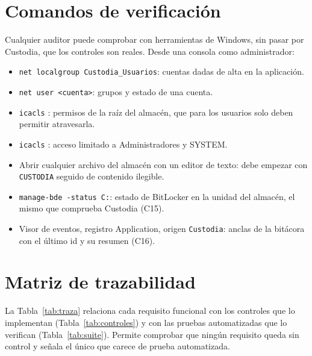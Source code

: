 \documentclass[conference]{IEEEtran}
\begin{document}
\section{Comandos de verificación}
\label{anx:comandos}
Cualquier auditor puede comprobar con herramientas de Windows, sin pasar por Custodia, que los controles son reales. Desde una consola como administrador:
\begin{itemize}
    \item \texttt{net localgroup Custodia\_Usuarios}: cuentas dadas de alta en la aplicación.
    \item \texttt{net user <cuenta>}: grupos y estado de una cuenta.
    \item \texttt{icacls} : permisos de la raíz del almacén, que para los usuarios solo deben permitir atravesarla.
    \item \texttt{icacls} : acceso limitado a Administradores y SYSTEM.
    \item Abrir cualquier archivo del almacén con un editor de texto: debe empezar con \texttt{CUSTODIA} seguido de contenido ilegible.
    \item \texttt{manage-bde -status C:}: estado de BitLocker en la unidad del almacén, el mismo que comprueba Custodia (C15).
    \item Visor de eventos, registro Application, origen \texttt{Custodia}: anclas de la bitácora con el último id y su resumen (C16).
\end{itemize}

\section{Matriz de trazabilidad}
\label{anx:trazabilidad}
La Tabla~\ref{tab:traza} relaciona cada requisito funcional con los controles que lo implementan (Tabla~\ref{tab:controles}) y con las pruebas automatizadas que lo verifican (Tabla~\ref{tab:suite}). Permite comprobar que ningún requisito queda sin control y señala el único que carece de prueba automatizada.
\end{document}
